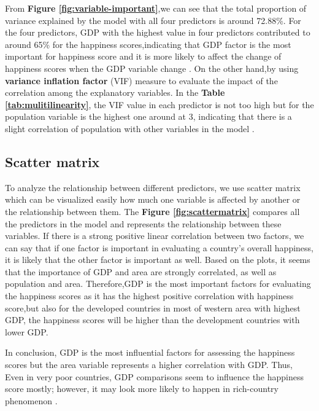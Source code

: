 \documentclass[11pt,a4paper,]{article}
\begin{document}
From \textbf{Figure \ref{fig:variable-important}},we can see that the total proportion of variance explained by the model with all four predictors is around 72.88\%. For the four predictors, GDP with the highest value in four predictors contributed to around 65\% for the happiness scores,indicating that GDP factor is the most important for happiness score and it is more likely to affect the change of happiness scores when the GDP variable change \autocite{gromping2015variable}. On the other hand,by using \textbf{variance inflation factor} (VIF) measure to evaluate the impact of the correlation among the explanatory variables. In the \textbf{Table \ref{tab:mulitilinearity}}, the VIF value in each predictor is not too high but for the population variable is the highest one around at 3, indicating that there is a slight correlation of population with other variables in the model \autocite{daoud2017multicollinearity}.

\hypertarget{scatter-matrix}{%
\subsection{Scatter matrix}\label{scatter-matrix}}

To analyze the relationship between different predictors, we use scatter matrix which can be visualized easily how much one variable is affected by another or the relationship between them. The \textbf{Figure \ref{fig:scattermatrix}} compares all the predictors in the model and represents the relationship between these variables. If there is a strong positive linear correlation between two factors, we can say that if one factor is important in evaluating a country's overall happiness, it is likely that the other factor is important as well. Based on the plots, it seems that the importance of GDP and area are strongly correlated, as well as population and area. Therefore,GDP is the most important factors for evaluating the happiness scores as it has the highest positive correlation with happiness score,but also for the developed countries in most of western area with highest GDP, the happiness scores will be higher than the development countries with lower GDP.

In conclusion, GDP is the most influential factors for assessing the happiness scores but the area variable represents a higher correlation with GDP. Thus, Even in very poor countries, GDP comparisons seem to influence the happiness score mostly; however, it may look more likely to happen in rich-country phenomenon \autocite{clark2011will}.
\end{document}
